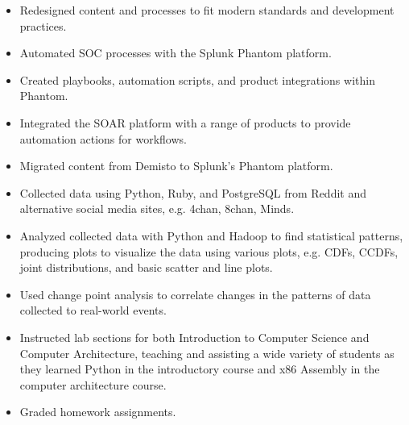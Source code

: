 \documentclass[10pt]{setzerresume}
\begin{document}
  \begin{itemize}[nosep]
    \item Redesigned content and processes to fit modern standards and development practices.
    \item Automated SOC processes with the Splunk Phantom platform.
    \item Created playbooks, automation scripts, and product integrations within Phantom.
    \item Integrated the SOAR platform with a range of products to provide automation actions for workflows.
    \item Migrated content from Demisto to Splunk's Phantom platform.
  \end{itemize}



  \begin{itemize}[nosep]%
    \item Collected data using Python, Ruby, and PostgreSQL from Reddit and alternative social media sites, e.g. 4chan, 8chan, Minds.
    \item Analyzed collected data with Python and Hadoop to find statistical patterns, producing plots to visualize the data using various plots, e.g. CDFs, CCDFs, joint distributions, and basic scatter and line plots.
    \item Used change point analysis to correlate changes in the patterns of data collected to real-world events.
    \item Instructed lab sections for both Introduction to Computer Science and Computer Architecture, teaching and assisting a wide variety of students as they learned Python in the introductory course and x86 Assembly in the computer architecture course.
    \item Graded homework assignments.
  \end{itemize}


\end{document}

